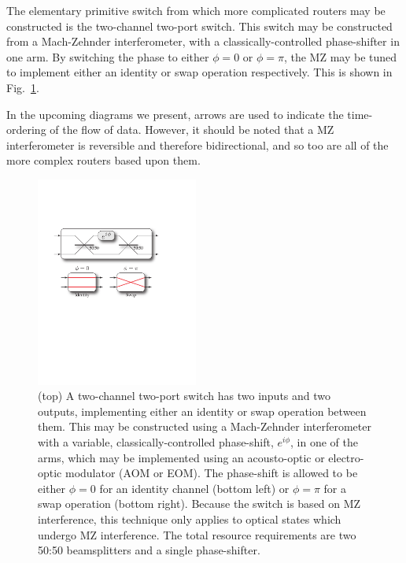 The elementary primitive switch from which more complicated routers may be constructed is the two-channel two-port switch. This switch may be constructed from a Mach-Zehnder interferometer, with a classically-controlled phase-shifter in one arm. By switching the phase to either \mbox{$\phi=0$} or \mbox{$\phi=\pi$}, the MZ may be tuned to implement either an identity or swap operation respectively. This is shown in Fig.~\ref{fig:two_channel_two_port_switch}.

In the upcoming diagrams we present, arrows are used to indicate the time-ordering of the flow of data. However, it should be noted that a MZ interferometer is reversible and therefore bidirectional, and so too are all of the more complex routers based upon them.

\begin{figure}[!htbp]
\includegraphics[clip=true, width=0.475\textwidth]{two_channel_two_port_switch}
\captionspacefig \caption{(top) A two-channel two-port switch has two inputs and two outputs, implementing either an identity or swap operation between them. This may be constructed using a Mach-Zehnder interferometer with a variable, classically-controlled phase-shift, $e^{i\phi}$, in one of the arms, which may be implemented using an acousto-optic or electro-optic modulator (AOM or EOM). The phase-shift is allowed to be either \mbox{$\phi=0$} for an identity channel (bottom left) or \mbox{$\phi=\pi$} for a swap operation (bottom right). Because the switch is based on MZ interference, this technique only applies to optical states which undergo MZ interference. The total resource requirements are two 50:50 beamsplitters and a single phase-shifter.} \label{fig:two_channel_two_port_switch} 
\end{figure}

